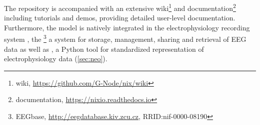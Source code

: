 The  repository is accompanied with an extensive wiki\footnote{ wiki, \url{https://github.com/G-Node/nix/wiki}} and documentation\footnote{ documentation, \url{https://nixio.readthedocs.io}} including tutorials and demos, providing detailed user-level documentation. Furthermore, the  model is natively integrated in the electrophysiology recording system , the \footnote{EEGbase, \url{http://eegdatabase.kiv.zcu.cz}, RRID:nif-0000-08190} a system for storage, management, sharing and retrieval of EEG data as well as , a Python tool for standardized representation of electrophysiology data (\cref{sec:neo}).







